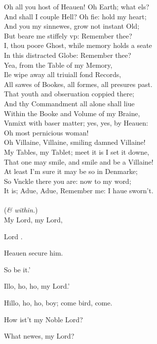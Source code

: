 \documentclass[a5paper,DIV=calc,11pt]{scrbook}
\begin{document}
\begin{drama*}
    \hamspeaks Oh all you host of Heauen! Oh Earth; what els?\\
    And shall I couple Hell? Oh fie: hold my heart;\\
    And you my sinnewes, grow not instant Old;\\
    But beare me stiffely vp: Remember thee?\\
    I, thou poore Ghost, while memory holds a seate\\
    In this distracted Globe: Remember thee?\\
    Yea, from the Table of my Memory,\\
    Ile wipe away all triuiall fond Records,\\
    All sawes of Bookes, all formes, all presures past.\\
    That youth and obseruation coppied there;\\
    And thy Commandment all alone shall liue\\
    Within the Booke and Volume of my Braine,\\
    Vnmixt with baser matter; yes, yes, by Heauen:\\
    Oh most pernicious woman!\\
    Oh Villaine, Villaine, smiling damned Villaine!\\
    My Tables, my Tablet; meet it is I set it downe,\\
    That one may smile, and smile and be a Villaine!\\
    At least I'm sure it may be so in Denmarke;\\
    So Vnckle there you are: now to my word;\\
    It is; Adue, Adue, Remember me: I haue sworn't.\\
    \mbox{}\\
    (\textit{\hor \& \mar within.})\\
    My Lord, my Lord,
    
    
    \marspeaks Lord \ham.
    
    \horspeaks Heauen secure him.
    
    \marspeaks So be it.'
    
    \horspeaks Illo, ho, ho, my Lord.'
    
    \hamspeaks Hillo, ho, ho, boy; come bird, come.
    
    \marspeaks How ist't my Noble Lord?
    
    \horspeaks What newes, my Lord?
    

\end{drama*}
\end{document}

